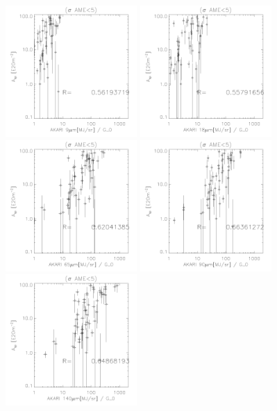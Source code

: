 \begin{figure}[!htb]
\centering
 \includegraphics[width=50mm]{IRIntG0MWAmp/akari9G0_Asp_nosp.pdf}
  \includegraphics[width=50mm]{IRIntG0MWAmp/akari18G0_Asp_nosp.pdf}
  \includegraphics[width=50mm]{IRIntG0MWAmp/akari65G0_Asp_nosp.pdf}
  \includegraphics[width=50mm]{IRIntG0MWAmp/akari90G0_Asp_nosp.pdf}
  \includegraphics[width=50mm]{IRIntG0MWAmp/akari140G0_Asp_nosp.pdf}

\end{figure}
